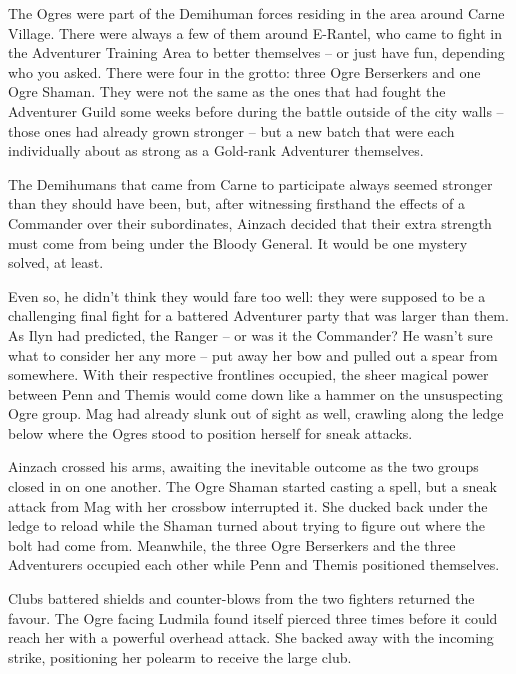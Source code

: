  

The Ogres were part of the Demihuman forces residing in the area around Carne Village. There were always a few of them around E-Rantel, who came to fight in the Adventurer Training Area to better themselves – or just have fun, depending who you asked. There were four in the grotto: three Ogre Berserkers and one Ogre Shaman. They were not the same as the ones that had fought the Adventurer Guild some weeks before during the battle outside of the city walls – those ones had already grown stronger – but a new batch that were each individually about as strong as a Gold-rank Adventurer themselves.

 

The Demihumans that came from Carne to participate always seemed stronger than they should have been, but, after witnessing firsthand the effects of a Commander over their subordinates, Ainzach decided that their extra strength must come from being under the Bloody General. It would be one mystery solved, at least.

 

Even so, he didn’t think they would fare too well: they were supposed to be a challenging final fight for a battered Adventurer party that was larger than them. As Ilyn had predicted, the Ranger – or was it the Commander? He wasn’t sure what to consider her any more – put away her bow and pulled out a spear from somewhere. With their respective frontlines occupied, the sheer magical power between Penn and Themis would come down like a hammer on the unsuspecting Ogre group. Mag had already slunk out of sight as well, crawling along the ledge below where the Ogres stood to position herself for sneak attacks.

 

Ainzach crossed his arms, awaiting the inevitable outcome as the two groups closed in on one another. The Ogre Shaman started casting a spell, but a sneak attack from Mag with her crossbow interrupted it. She ducked back under the ledge to reload while the Shaman turned about trying to figure out where the bolt had come from. Meanwhile, the three Ogre Berserkers and the three Adventurers occupied each other while Penn and Themis positioned themselves.

 

Clubs battered shields and counter-blows from the two fighters returned the favour. The Ogre facing Ludmila found itself pierced three times before it could reach her with a powerful overhead attack. She backed away with the incoming strike, positioning her polearm to receive the large club.

